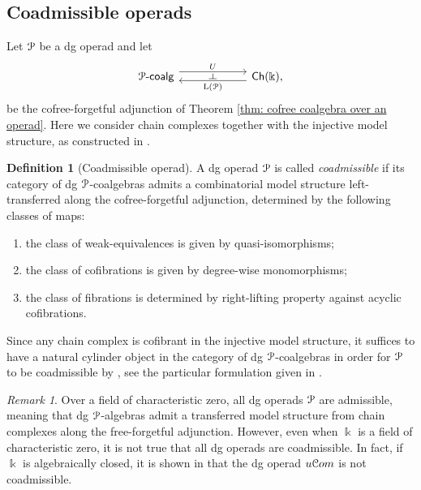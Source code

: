 \documentclass{proc-l}
\renewcommand{\mathcal}{\EuScript}
\newcommand{\baseonecat}{\mathsf{Ch}(\kk)}
\newcommand{\oneop}{\mathcal{P}}
\newcommand{\onepcoalg}{\mathcal{P}\text{-}\mathsf{coalg}}
\theoremstyle{plain}
\theoremstyle{definition}
\newtheorem{definition}[{theorem}]{Definition}
\theoremstyle{remark}
\newtheorem{remark}[{theorem}]{Remark}
\newcommand{\kk}{\Bbbk}
\begin{document}
\subsection{Coadmissible operads}%
\label{Section:2.4}
Let $\oneop$ be a dg operad and let
\[
\begin{tikzcd}[column sep=5pc,row sep=3pc]
\onepcoalg \arrow[r, shift left=1.1ex, "U"{name=F}] & \baseonecat , \arrow[l, shift left=.75ex, "\mathrm{L}(\oneop)"{name=U}]
\arrow[phantom, from=F, to=U, , "\dashv" rotate=-90]
\end{tikzcd}
\]
be the cofree-forgetful adjunction of Theorem \ref{thm: cofree coalgebra over an operad}. Here we consider chain complexes together with the injective model structure, as constructed in \cite[Theorem 2.3.13]{Hovey}.

\begin{definition}[{Coadmissible operad}]%
\label{Definition:2.11}
A dg operad $\oneop$ is called \textit{coadmissible} if its category of dg $\oneop$-coalgebras admits a combinatorial model structure left-transferred along the cofree-forgetful adjunction, determined by the following classes of maps:
\begin{enumerate}
\item the class of weak-equivalences is given by quasi-isomorphisms;

\item the class of cofibrations is given by degree-wise monomorphisms;

\item the class of fibrations is determined by right-lifting property against acyclic cofibrations.
\end{enumerate}
\end{definition}

Since any chain complex is cofibrant in the injective model structure, it suffices to have a natural cylinder object in the category of dg $\oneop$-coalgebras in order for $\oneop$ to be coadmissible by \cite{BHKKRS, HKRS}, see the particular formulation given in \cite[Appendix B]{premierpapier}.

\begin{remark}%
\label{Remark:2.12}Over a field of characteristic zero, all dg operads $\oneop$ are admissible, meaning that dg $\oneop$-algebras admit a transferred model structure from chain complexes along the free-forgetful adjunction. However, even when $\kk$ is a field of characteristic zero, it is not true that all dg operads are coadmissible. In fact, if $\kk$ is algebraically closed, it is shown in \cite[Proposition 8.10]{linearcoalgebras} that the dg operad $u\mathcal{C}om$ is not coadmissible.
\end{remark}
\end{document}
